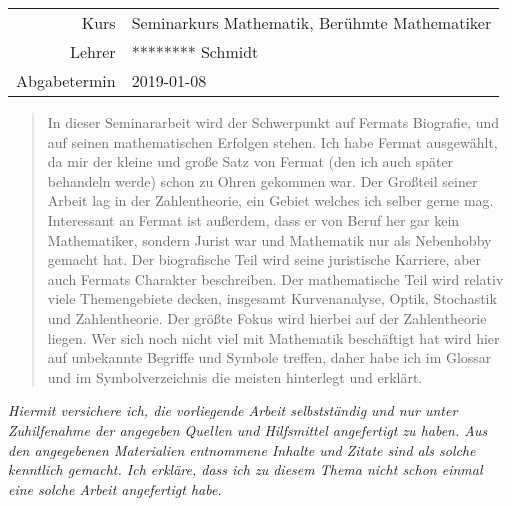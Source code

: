 \documentclass{article}
\begin{document}

\maketitle

\vspace{1cm}

\begin{center}
    \begin{tabular}{r|l}
        Kurs         & Seminarkurs Mathematik, Berühmte Mathematiker \\
        Lehrer       & ******** Schmidt                              \\
        Abgabetermin & 2019-01-08                                    \\
    \end{tabular}
\end{center}

\vspace{2cm}

\begin{abstract}
    In dieser Seminararbeit wird der Schwerpunkt auf Fermats Biografie, und auf seinen mathematischen Erfolgen stehen. Ich habe Fermat ausgewählt, da mir der kleine und große Satz von Fermat (den ich auch später behandeln werde) schon zu Ohren gekommen war. Der Großteil seiner Arbeit lag in der Zahlentheorie, ein Gebiet welches ich selber gerne mag. Interessant an Fermat ist außerdem, dass er von Beruf her gar kein Mathematiker, sondern Jurist war und Mathematik nur als Nebenhobby gemacht hat. Der biografische Teil wird seine juristische Karriere, aber auch Fermats Charakter beschreiben. Der mathematische Teil wird relativ viele Themengebiete decken, insgesamt Kurvenanalyse, Optik, Stochastik und Zahlentheorie. Der größte Fokus wird hierbei auf der Zahlentheorie liegen. Wer sich noch nicht viel mit Mathematik beschäftigt hat wird hier auf unbekannte Begriffe und Symbole treffen, daher habe ich im Glossar und im Symbolverzeichnis die meisten hinterlegt und erklärt.
\end{abstract}

\newpage


\tableofcontents
\newpage


\textit{Hiermit versichere ich, die vorliegende Arbeit selbstständig und nur unter Zuhilfenahme der angegeben Quellen und Hilfsmittel angefertigt zu haben. Aus den angegebenen Materialien entnommene Inhalte und Zitate sind als solche kenntlich gemacht. Ich erkläre, dass ich zu diesem Thema nicht schon einmal eine solche Arbeit angefertigt habe.}





\newpage


\label{sec:glossary}
\printglossary
\label{sec:symb}
\printnomenclature
\newpage

\printbibliography[heading=bibintoc]
\end{document}
